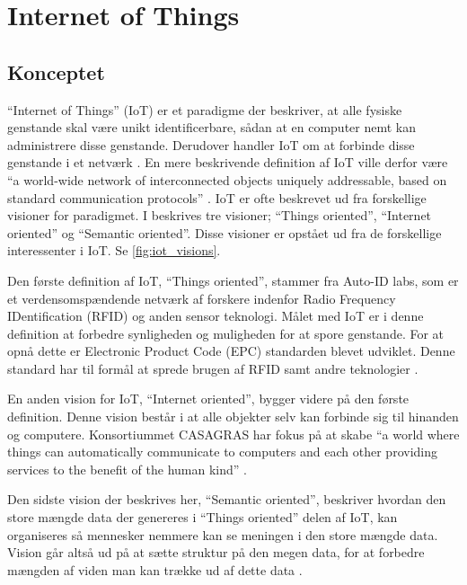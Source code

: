 \section{Internet of Things} %
\label{sec:internet_of_things}

\subsection{Konceptet}
\label{sub:iot_koncept}


\enquote{Internet of Things} (IoT) er et paradigme der beskriver, at alle fysiske genstande skal være unikt identificerbare, sådan at en computer nemt kan administrere disse genstande. Derudover handler IoT om at forbinde disse genstande i et netværk \cite{kopetz2011real}. En mere beskrivende definition af IoT ville derfor være \enquote{a world-wide network of interconnected objects uniquely addressable, based on standard communication protocols} \cite{iot_survey_2010}. IoT er ofte beskrevet ud fra forskellige visioner for paradigmet. I \cite{iot_survey_2010}  beskrives tre visioner; \enquote{Things oriented}, \enquote{Internet oriented} og \enquote{Semantic oriented}. Disse visioner er opstået ud fra de forskellige interessenter i IoT. Se \cref{fig:iot_visions}.

Den første definition af IoT, \enquote{Things oriented}, stammer fra Auto-ID labs, som er et verdensomspændende netværk af forskere indenfor Radio Frequency IDentification (RFID) og anden sensor teknologi. Målet med IoT er i denne definition at forbedre synligheden og muligheden for at spore genstande. For at opnå dette er Electronic Product Code (EPC) standarden blevet udviklet. Denne standard har til formål at sprede brugen af RFID samt andre teknologier \cite{iot_survey_2010}.

En anden vision for IoT, \enquote{Internet oriented}, bygger videre på den første definition. Denne vision består i at alle objekter selv kan forbinde sig til hinanden og computere. Konsortiummet CASAGRAS har fokus på at skabe \enquote{a world where things can automatically communicate to computers and each other providing services to the benefit of the human kind} \cite{iot_survey_2010}.


Den sidste vision der beskrives her, \enquote{Semantic oriented}, beskriver hvordan den store mængde data der genereres i \enquote{Things oriented} delen af IoT, kan organiseres så mennesker nemmere kan se meningen i den store mængde data. Vision går altså ud på at sætte struktur på den megen data, for at forbedre mængden af viden man kan trække ud af dette data \cite{iot_semantics_2012}.


